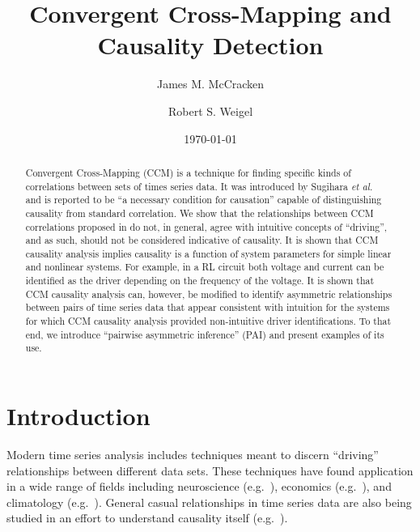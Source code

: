 \documentclass[twocolumn,aps,pre,groupedaddress]{revtex4-1}
\begin{document}
\title{Convergent Cross-Mapping and Causality Detection}
\author{James M. McCracken}
\author{Robert S. Weigel}
\date{\today}

\begin{abstract}
Convergent Cross-Mapping (CCM) is a technique for finding specific kinds of correlations between sets of times series data.  It was introduced by Sugihara {\em et al.\ }\cite{Sugihara2012} and is reported to be ``a necessary condition for causation'' capable of distinguishing causality from standard correlation.  We show that the relationships between CCM correlations proposed in \cite{Sugihara2012} do not, in general, agree with intuitive concepts of ``driving'', and as such, should not be considered indicative of causality.  It is shown that CCM causality analysis implies causality is a function of system parameters for simple linear and nonlinear systems.  For example, in a RL circuit both voltage and current can be identified as the driver depending on the frequency of the voltage.  It is shown that CCM causality analysis can, however, be modified to identify asymmetric relationships between pairs of time series data that appear consistent with intuition for the systems for which CCM causality analysis provided non-intuitive driver identifications.  To that end, we introduce ``pairwise asymmetric inference'' (PAI) and present examples of its use.  
\end{abstract}

\pacs{}
\maketitle

\section{Introduction}
Modern time series analysis includes techniques meant to discern ``driving'' relationships between different data sets.  These techniques have found application in a wide range of fields including neuroscience (e.g.\ \cite{Kaminski2001}), economics (e.g.\ \cite{dufour1998,dufour2006}), and climatology (e.g.\ \cite{mosedale2006}).  General casual relationships in time series data are also being studied in an effort to understand causality itself (e.g.\ \cite{eichler2012}).  
\end{document}
